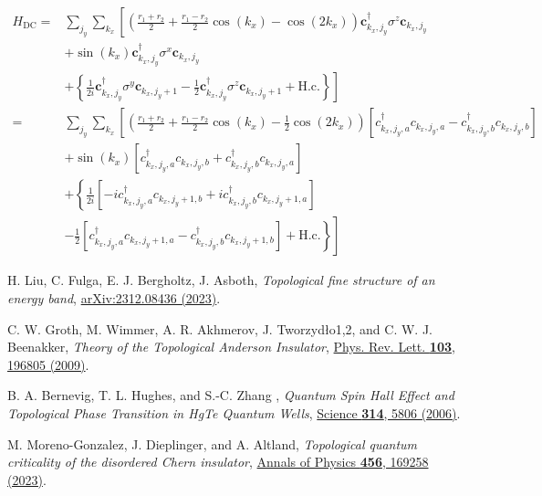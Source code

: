 \documentclass[english]{scrartcl}
\begin{document}
\begin{align*}
H_{\text{DC}} = & \sum_{j_y} \sum_{k_x} \left [\left(\frac{r_1 + r_2}{2} + \frac{r_1 - r_2}{2} \cos(k_x) - \cos(2 k_x)\right)\bm c_{k_x, j_y}^\dagger \sigma^z \bm c_{k_x, j_y} \right. \\ 
&+ \sin(k_x)\bm c_{k_x, j_y}^\dagger \sigma^x \bm c_{k_x, j_y} \\
&\left. + \left \{ \frac{1}{2i} \bm c_{k_x, j_y}^\dagger \sigma^y \bm c_{k_x, j_y + 1} - \frac{1}{2} \bm c_{k_x, j_y}^\dagger \sigma^z \bm c_{k_x, j_y + 1} + \text{H.c.} \right \} \right ] \\
= & \sum_{j_y} \sum_{k_x} \left [\left(\frac{r_1 + r_2}{2} + \frac{r_1 - r_2}{2} \cos(k_x) - \frac{1}{2} \cos(2 k_x)\right) \left[c_{k_x, j_y,a}^\dagger  c_{k_x, j_y, a} - c_{k_x, j_y,b}^\dagger  c_{k_x, j_y, b}\right] \right. \\ 
&+ \sin(k_x) \left[c_{k_x, j_y,a}^\dagger  c_{k_x, j_y, b} + c_{k_x, j_y,b}^\dagger  c_{k_x, j_y, a}\right]  \\
&+ \left \{ \frac{1}{2i} \left[-ic_{k_x, j_y,a}^\dagger  c_{k_x, j_y+1, b} + i c_{k_x, j_y,b}^\dagger  c_{k_x, j_y + 1, a}\right] \right. \\
& \left.  \left. - \frac{1}{2}  \left[c_{k_x, j_y,a}^\dagger  c_{k_x, j_y + 1, a} - c_{k_x, j_y,b}^\dagger  c_{k_x, j_y + 1, b}\right]  + \text{H.c.} \right \} \right ]
\end{align*}

\printnoidxglossaries

\newpage
\begin{thebibliography}{10}
H. Liu, C. Fulga, E. J. Bergholtz, J. Asboth, {\em Topological fine structure of an energy band}, \href{https://arxiv.org/abs/2312.08436}{arXiv:2312.08436 (2023)}.

C. W. Groth, M. Wimmer, A. R. Akhmerov, J. Tworzydło1,2, and C. W. J. Beenakker, {\em Theory of the Topological Anderson Insulator}, \href{https://journals.aps.org/prl/abstract/10.1103/PhysRevLett.103.196805}{Phys. Rev. Lett. {\bfseries 103}, 196805 (2009)}.

B. A. Bernevig, T. L. Hughes, and S.-C. Zhang , {\em Quantum Spin Hall Effect and Topological Phase Transition in HgTe Quantum Wells}, \href{https://www.science.org/doi/10.1126/science.1133734}{Science {\bfseries 314}, 5806 (2006)}.

M. Moreno-Gonzalez, J. Dieplinger, and A. Altland, {\em Topological quantum criticality of the disordered Chern insulator}, \href{https://www.sciencedirect.com/science/article/pii/S000349162300043X?}{Annals of Physics {\bfseries 456}, 169258 (2023)}.
\end{thebibliography}
\end{document}
